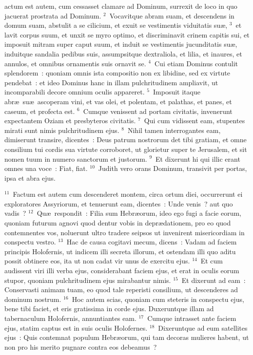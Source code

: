 \bchapter
{}actum est autem, cum cessasset clamare ad Dominum, surrexit de loco in quo jacuerat prostrata ad Dominum.
${}^{2}$~Vocavitque abram suam, et descendens in domum suam, abstulit a se cilicium, et exuit se vestimentis viduitatis su\ae ,
${}^{3}$~et lavit corpus suum, et unxit se myro optimo, et discriminavit crinem capitis sui, et imposuit mitram super caput suum, et induit se vestimentis jucunditatis su\ae , induitque sandalia pedibus suis, assumpsitque dextraliola, et lilia, et inaures, et annulos, et omnibus ornamentis suis ornavit se.
${}^{4}$~Cui etiam Dominus contulit splendorem~: quoniam omnis ista compositio non ex libidine, sed ex virtute pendebat~: et ideo Dominus hanc in illam pulchritudinem ampliavit, ut incomparabili decore omnium oculis appareret.
${}^{5}$~Imposuit itaque abr\ae\ su\ae\ ascoperam vini, et vas olei, et polentam, et palathas, et panes, et caseum, et profecta est.
${}^{6}$~Cumque venissent ad portam civitatis, invenerunt expectantem Oziam et presbyteros civitatis.
${}^{7}$~Qui cum vidissent eam, stupentes mirati sunt nimis pulchritudinem ejus.
${}^{8}$~Nihil tamen interrogantes eam, dimiserunt transire, dicentes~: Deus patrum nostrorum det tibi gratiam, et omne consilium tui cordis sua virtute corroboret, ut glorietur super te Jerusalem, et sit nomen tuum in numero sanctorum et justorum.
${}^{9}$~Et dixerunt hi qui illic erant omnes una voce~: Fiat, fiat.
${}^{10}$~Judith vero orans Dominum, transivit per portas, ipsa et abra ejus.


${}^{11}$~Factum est autem cum descenderet montem, circa ortum diei, occurrerunt ei exploratores Assyriorum, et tenuerunt eam, dicentes~: Unde venis~? aut quo vadis~?
${}^{12}$~Qu\ae\ respondit~: Filia sum Hebr\ae orum, ideo ego fugi a facie eorum, quoniam futurum agnovi quod dentur vobis in depr\ae dationem, pro eo quod contemnentes vos, noluerunt ultro tradere seipsos ut invenirent misericordiam in conspectu vestro.
${}^{13}$~Hac de causa cogitavi mecum, dicens~: Vadam ad faciem principis Holofernis, ut indicem illi secreta illorum, et ostendam illi quo aditu possit obtinere eos, ita ut non cadat vir unus de exercitu ejus.
${}^{14}$~Et cum audissent viri illi verba ejus, considerabant faciem ejus, et erat in oculis eorum stupor, quoniam pulchritudinem ejus mirabantur nimis.
${}^{15}$~Et dixerunt ad eam~: Conservasti animam tuam, eo quod tale reperisti consilium, ut descenderes ad dominum nostrum.
${}^{16}$~Hoc autem scias, quoniam cum steteris in conspectu ejus, bene tibi faciet, et eris gratissima in corde ejus. Duxeruntque illam ad tabernaculum Holofernis, annuntiantes eam.
${}^{17}$~Cumque intrasset ante faciem ejus, statim captus est in suis oculis Holofernes.
${}^{18}$~Dixeruntque ad eum satellites ejus~: Quis contemnat populum Hebr\ae orum, qui tam decoras mulieres habent, ut non pro his merito pugnare contra eos debeamus~?


